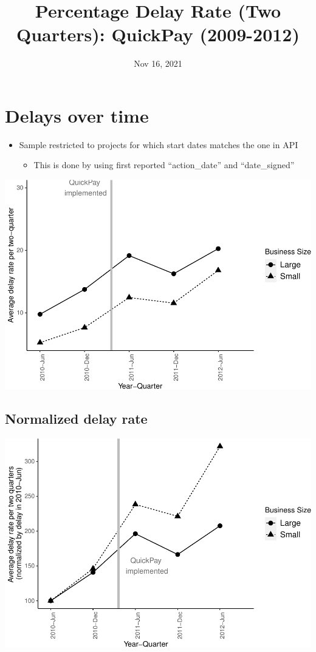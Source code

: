 \documentclass[
]{article}
\title{Percentage Delay Rate (Two Quarters): QuickPay (2009-2012)}
\author{}
\date{\vspace{-2.5em}Nov 16, 2021}
\providecommand{\tightlist}{%
  \setlength{\itemsep}{0pt}\setlength{\parskip}{0pt}}
\begin{document}
\maketitle

\hypertarget{delays-over-time}{%
\section{Delays over time}\label{delays-over-time}}

\begin{itemize}
\tightlist
\item
  Sample restricted to projects for which start dates matches the one in
  API

  \begin{itemize}
  \tightlist
  \item
    This is done by using first reported ``action\_date'' and
    ``date\_signed''
  \end{itemize}
\end{itemize}

\includegraphics{qp_first_pc_delay_two_quarters_files/figure-latex/plot_pc_delay-1.pdf}

\hypertarget{normalized-delay-rate}{%
\subsection{Normalized delay rate}\label{normalized-delay-rate}}

\includegraphics{qp_first_pc_delay_two_quarters_files/figure-latex/normalized_plot-1.pdf}
\end{document}
